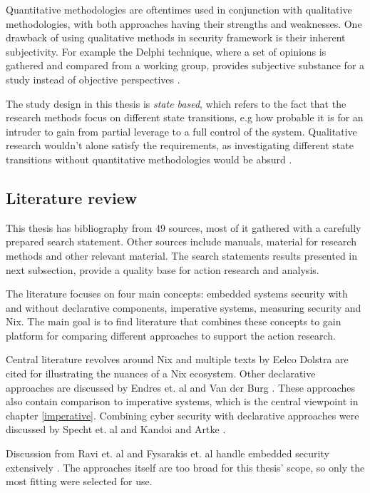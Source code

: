 Quantitative methodologies are oftentimes used in conjunction with
qualitative methodologies, with both approaches having their strengths and
weaknesses. One drawback of using qualitative methods in security
framework is their inherent subjectivity. For example the Delphi
technique, where a set of opinions is gathered and compared from a
working group, provides subjective substance for a study instead of
objective perspectives \cite{wang2005information}.

The study design in this thesis is \textit{state based}, which refers
to the fact that the research methods focus on different state
transitions, e.g how probable it is  for an intruder to gain from
partial leverage to a full control of the system. Qualitative research
wouldn't alone satisfy the requirements, as investigating different
state transitions without quantitative methodologies would be absurd
\cite{ramos2017model}.

\subsection{Literature review}\label{litrev}

This thesis has bibliography from 49 sources, most of it gathered with
a carefully prepared search statement. Other sources include manuals,
material for research methods and other relevant material. The search
statements results presented in next subsection, provide a quality base
for action research and analysis.

The literature focuses on four main concepts: embedded systems
security with and without declarative components, imperative systems,
measuring security and Nix. The main goal is to find literature that
combines these concepts to gain platform for comparing different
approaches to support the action research.

Central literature revolves around Nix and multiple texts by Eelco
Dolstra are cited for illustrating the nuances of a Nix
ecosystem. Other declarative approaches are discussed by Endres
et. al and Van der Burg \cite{van2010declarative, endres2017declarative}. These approaches also contain comparison to
imperative systems, which is the central viewpoint in chapter
\ref{imperative}. Combining cyber security with declarative approaches
were discussed by Specht et. al and Kandoi and Artke
\cite{specht2007analysis, kandoi2021operating}.

Discussion from Ravi et. al and Fysarakis et. al handle embedded security
extensively \cite{ravi2004security, fysarakis2014embedded}. The
approaches itself  are too broad for this thesis' scope, so
only the most fitting were selected for use.

